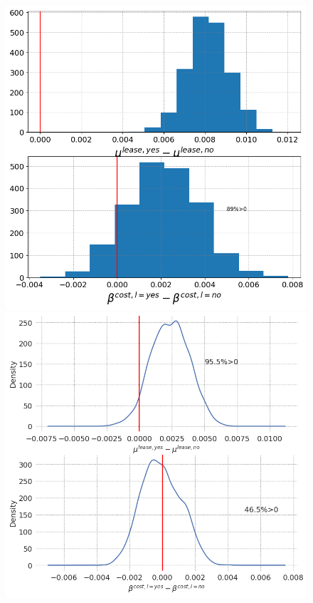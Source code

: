 \documentclass[a4paper]{article}
\begin{document}
\begin{figure}
\begin{minipage}{.48\textwidth}
  \centering
  \includegraphics[width=1\linewidth]{figures/bayes_hypos.png}
 \end{minipage}\qquad
\begin{minipage}{.48\textwidth}
  \centering
  \includegraphics[width=1\linewidth]{figures/bayes_hypos_const.png}


\end{minipage}
\end{figure}
\end{document}
